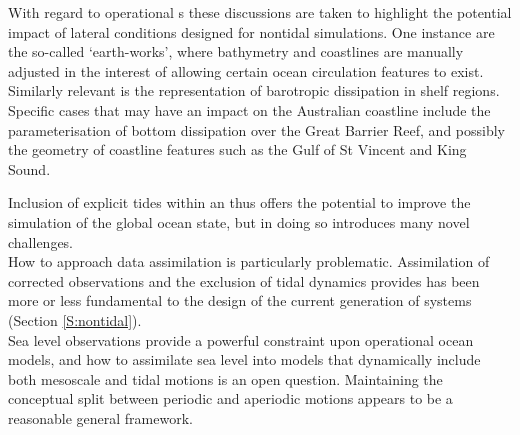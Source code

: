 With regard to operational \OGCM{}s these discussions are taken to highlight the potential impact of lateral conditions designed for nontidal simulations.  
One instance are the so-called `earth-works', where bathymetry and coastlines are manually adjusted in the interest of allowing certain ocean circulation features to exist.  
Similarly relevant is the representation of barotropic dissipation in shelf regions. 
Specific cases that may have an impact on the Australian coastline include the parameterisation of bottom dissipation over the Great Barrier Reef, and possibly the geometry of coastline features such as the Gulf of St Vincent and King Sound.




Inclusion of explicit tides within an \OGCM{} thus offers the potential to improve the simulation of the global ocean state, but in doing so introduces many novel challenges.\\
How to approach data assimilation is particularly problematic.  Assimilation of corrected observations and the exclusion of tidal dynamics provides has been more or less fundamental to the design of the current generation of \GODAE{} systems (Section \ref{S:nontidal}).\\
Sea level observations provide a powerful constraint upon operational ocean models, and how to assimilate sea level into models that dynamically include both mesoscale and tidal motions is an open question.   Maintaining the conceptual split between periodic and aperiodic motions appears to be a reasonable general framework.

